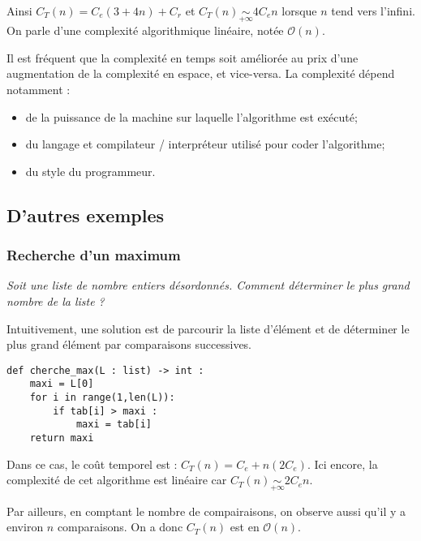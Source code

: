 \begin{exemple}
Ainsi $C_T(n) = C_e (3 + 4n)  + C_r$ et $C_T(n)  \underset{+\infty}{\sim} 4C_e n$ lorsque $n$ tend vers l'infini. On parle d'une complexité algorithmique linéaire, notée $\mathcal{O}(n)$.



\end{exemple}



Il est fréquent que la complexité en temps soit améliorée au prix d'une augmentation de la complexité en espace, et vice-versa.
La complexité dépend notamment :
\begin{itemize}
\item de la puissance de la machine sur laquelle l'algorithme est exécuté;
\item du langage et compilateur / interpréteur utilisé pour coder l'algorithme;
\item du style du programmeur.
\end{itemize}



\subsection{D'autres exemples}
\subsubsection{Recherche d'un maximum}
\begin{exemple}
\textit{Soit une liste de nombre entiers désordonnés. Comment déterminer le plus grand nombre de la liste ?}

Intuitivement, une solution est de parcourir la liste d'élément et de déterminer le plus grand élément par comparaisons successives.

\noindent
\begin{minipage}[c]{.48\linewidth}
\begin{lstlisting}
def cherche_max(L : list) -> int :
    maxi = L[0]
    for i in range(1,len(L)):
        if tab[i] > maxi : 
            maxi = tab[i]
    return maxi
\end{lstlisting}

\end{minipage} \hfill 
\begin{minipage}[c]{.48\linewidth}
Dans ce cas, le coût temporel est :
$C_T(n) = C_e + n\left(2 C_e \right)$. Ici encore, la complexité de cet algorithme est linéaire car $C_T(n) \underset{+\infty}{\sim} 2 C_e n$.

Par ailleurs, en comptant le nombre de compairaisons, on observe aussi qu'il y a environ $n$ comparaisons. On a donc $C_T(n)$ est en $\mathcal{O}(n)$.
\end{minipage} 


\end{exemple}

